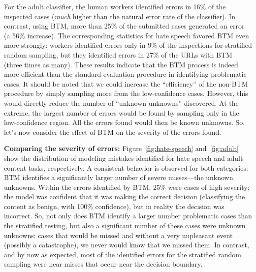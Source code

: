 For the adult classifier, the human workers identified errors in 16\%
of the inspected cases (\textit{much} higher than the natural error
rate of the classifier).  In contrast, using BTM, more than 25\% of
the submitted cases generated an error (a 56\% increase). The
corresponding statistics for hate speech favored BTM even more
strongly: workers identified errors only in 9\% of the inspections for
stratified random sampling, but they identified errors in 27\% of the
URLs with BTM (three times as many). 
These results indicate that the BTM process is indeed
more efficient than the standard evaluation procedure in identifying
problematic cases.  It should be noted that we could increase the
``efficiency'' of the non-BTM procedure by simply sampling more from
the low-confidence cases.  However, this would directly reduce the
number of ``unknown unknowns'' discovered.  At the extreme, the
largest number of errors would be found by sampling only in the
low-confidence region.  All the errors found would then be known
unknowns.  So, let's now consider the effect of BTM on the severity of
the errors found.

\textbf{Comparing the severity of errors:} Figure~\ref{fig:hate-speech} and~\ref{fig:adult} show the distribution of modeling mistakes identified for hate speech and adult content tasks, respectively. A consistent behavior is observed for both categories: BTM identifies a significantly larger number of severe misses---the unknown unknowns. Within the errors identified by BTM, 25\% were cases of high severity; the model was confident that it was making the correct decision (classifying the content as benign, with 100\% confidence), but in reality the decision was incorrect. So, not only does BTM identify a larger number problematic cases than the stratified testing, but also a significant number of these cases were unknown unknowns: cases that would be missed and without a very unpleasant event (possibly a catastrophe), we never would know that we missed them. In contrast, and by now as expected, most of the identified 
errors for the stratified random sampling were near misses that occur near the decision boundary.

